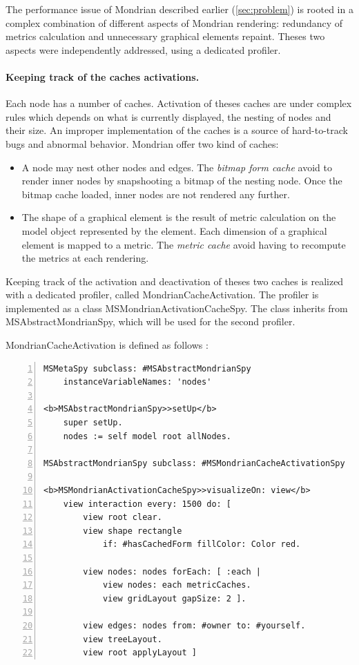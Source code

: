 \documentclass[runningheads]{llncs}
\newcommand{\ab}[1]{\nb{Alexandre}{blue}{#1}}
\newcommand{\lr}[1]{\nb{Lukas}{orange}{#1}}
\newcommand{\jr}[1]{\nb{Jorge}{cyan}{#1}}
\newcommand{\co}[1]{{\sf #1}}
\begin{document}

The performance issue of Mondrian described earlier (\autoref{sec:problem}) is rooted in a complex combination of different aspects of Mondrian rendering: redundancy of metrics calculation and unnecessary graphical elements repaint. Theses two aspects were independently addressed, using a dedicated profiler.

\paragraph{Keeping track of the caches activations.}
Each node has a number of caches. Activation of theses caches are under complex rules which depends on what is currently displayed, the nesting of nodes and their size. An improper implementation of the caches is a source of hard-to-track bugs and abnormal behavior. Mondrian offer two kind of caches:
\begin{itemize}
\item A node may nest other nodes and edges. The \emph{bitmap form cache} avoid to render inner nodes by snapshooting a bitmap of the nesting node. Once the bitmap cache loaded, inner nodes are not rendered any further.
\item The shape of a graphical element is the result of metric calculation on the model object represented by the element. Each dimension of a graphical element is mapped to a metric. The \emph{metric cache} avoid having to recompute the metrics at each rendering.
\end{itemize}

Keeping track of the activation and deactivation of theses two caches is realized with a dedicated profiler, called {\sc MondrianCacheActivation}. The profiler is implemented as a class \co{MSMondrianActivationCacheSpy}. The class inherits from \co{MSAbstractMondrianSpy}, which will be used for the second profiler.

{\sc MondrianCacheActivation} is defined as follows \lr{what does this demonstrate?}:

\begin{lstlisting}[numbers=left]
MSMetaSpy subclass: #MSAbstractMondrianSpy
    instanceVariableNames: 'nodes'

<b>MSAbstractMondrianSpy>>setUp</b>
    super setUp.
    nodes := self model root allNodes.

MSAbstractMondrianSpy subclass: #MSMondrianCacheActivationSpy

<b>MSMondrianActivationCacheSpy>>visualizeOn: view</b>
    view interaction every: 1500 do: [
        view root clear.
        view shape rectangle
            if: #hasCachedForm fillColor: Color red.
        
        view nodes: nodes forEach: [ :each |
            view nodes: each metricCaches.
            view gridLayout gapSize: 2 ].
        
        view edges: nodes from: #owner to: #yourself.
        view treeLayout.
        view root applyLayout ]
\end{lstlisting}
\end{document}
